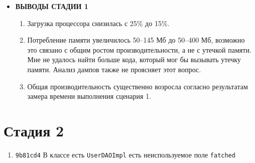 \documentclass{article}
\begin{document}
\begin{itemize}
		\item \textbf{ВЫВОДЫ СТАДИИ 1}
		\begin{enumerate}
			\item Загрузка процессора снизилась с 25\% до 15\%.
			\item Потребление памяти увеличилось 50--145 Мб до 50--400 Мб, возможно это связано с общим ростом производительности, а не с утечкой памяти. Мне не удалось найти больше кода, который мог бы вызывать утечку памяти. 
			Анализ дампов также не проясняет этот вопрос.
			\item Общая производительность существенно возросла согласно результатам замера времени выполнения сценария 1.
		\end{enumerate}
	\end{itemize}
	

\section*{Стадия 2}

\begin{enumerate}
	\item \texttt{9b81cd4} В классе есть \texttt{UserDAOImpl} есть неиспользуемое поле \texttt{fatched} 
\end{enumerate}		
\end{document}
